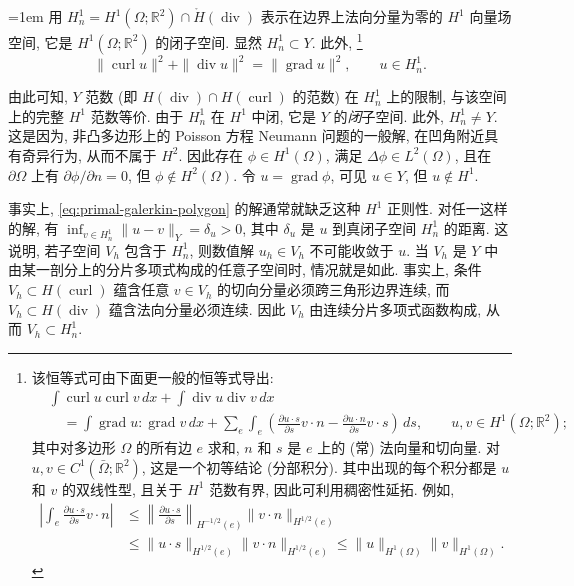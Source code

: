 \begingroup\emergencystretch=1em
{用 $H_n^1=H^1(\Omega;\mathbb R^2)\cap\mathring H(\operatorname{div})$ 表示在边界上法向分量为零的 $H^1$ 向量场空间, 它是 $H^1(\Omega;\mathbb R^2)$ 的闭子空间. 显然 $H_n^1\subset Y$. 此外,}%
\footnote{{该恒等式可由下面更一般的恒等式导出:}
\[
\begin{aligned}
&\int\operatorname{curl}u\operatorname{curl}v\,dx+\int\operatorname{div}u\operatorname{div}v\,dx\\
&\quad=\int\operatorname{grad}u:\operatorname{grad}v\,dx+\sum_e\int_e\left(\frac{\partial u\cdot s}{\partial s}v\cdot n-\frac{\partial u\cdot n}{\partial s}v\cdot s\right)\,ds,\qquad u,v\in H^1(\Omega;\mathbb R^2);
\end{aligned}
\]
{其中对多边形 $\Omega$ 的所有边 $e$ 求和, $n$ 和 $s$ 是 $e$ 上的 (常) 法向量和切向量. 对 $u,v\in C^1(\bar\Omega;\mathbb R^2)$, 这是一个初等结论 (分部积分). 其中出现的每个积分都是 $u$ 和 $v$ 的双线性型, 且关于 $H^1$ 范数有界, 因此可利用稠密性延拓. 例如,}
\[
\begin{aligned}
\left|\int_e\frac{\partial u\cdot s}{\partial s}v\cdot n\right|&\leq\left\|\frac{\partial u\cdot s}{\partial s}\right\|_{H^{-1/2}(e)}\|v\cdot n\|_{H^{1/2}(e)}\\
&\leq\|u\cdot s\|_{H^{1/2}(e)}\|v\cdot n\|_{H^{1/2}(e)}\leq\|u\|_{H^1(\Omega)}\|v\|_{H^1(\Omega)}.
\end{aligned}
\]
}%
\[
\|\operatorname{curl}u\|^2+\|\operatorname{div}u\|^2=\|\operatorname{grad}u\|^2,\qquad u\in H_n^1.
\]
\par\endgroup

{由此可知, $Y$ 范数 (即 $H(\operatorname{div})\cap H(\operatorname{curl})$ 的范数) 在 $H_n^1$ 上的限制, 与该空间上的完整 $H^1$ 范数等价. 由于 $H_n^1$ 在 $H^1$ 中闭, 它是 $Y$ 的\emph{闭}子空间. 此外, $H_n^1\ne Y$. 这是因为, 非凸多边形上的 Poisson 方程 Neumann 问题的一般解, 在凹角附近具有奇异行为, 从而不属于 $H^2$. 因此存在 $\phi\in H^1(\Omega)$, 满足 $\Delta\phi\in L^2(\Omega)$, 且在 $\partial\Omega$ 上有 $\partial\phi/\partial n=0$, 但 $\phi\notin H^2(\Omega)$. 令 $u=\operatorname{grad}\phi$, 可见 $u\in Y$, 但 $u\notin H^1$.}

{事实上, \eqref{eq:primal-galerkin-polygon} 的解通常就缺乏这种 $H^1$ 正则性. 对任一这样的解, 有 $\inf_{v\in H_n^1}\|u-v\|_Y=\delta_u>0$, 其中 $\delta_u$ 是 $u$ 到真闭子空间 $H_n^1$ 的距离. 这说明, 若子空间 $V_h$ 包含于 $H_n^1$, 则数值解 $u_h\in V_h$ 不可能收敛于 $u$. 当 $V_h$ 是 $Y$ 中由某一剖分上的分片多项式构成的任意子空间时, 情况就是如此. 事实上, 条件 $V_h\subset H(\operatorname{curl})$ 蕴含任意 $v\in V_h$ 的切向分量必须跨三角形边界连续, 而 $V_h\subset H(\operatorname{div})$ 蕴含法向分量必须连续. 因此 $V_h$ 由连续分片多项式函数构成, 从而 $V_h\subset H_n^1$.}

